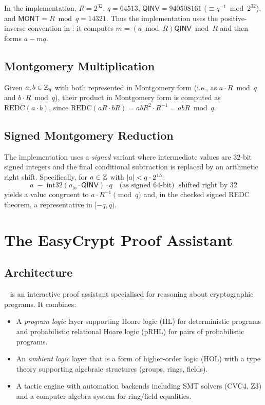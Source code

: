 In the \haetae{} implementation, $R = 2^{32}$, $q = 64513$,
$\mathsf{QINV} = 940508161$ ($\equiv q^{-1} \bmod 2^{32}$), and
$\mathsf{MONT} = R \bmod q = 14321$.  Thus the implementation uses the
positive-inverse convention in : it computes
$m = (a \bmod R)\mathsf{QINV} \bmod R$ and then forms $a - m q$.

\subsection{Montgomery Multiplication}

Given $a, b \in \mathbb{Z}_q$ with both represented in Montgomery form (i.e., as
$a \cdot R \bmod q$ and $b \cdot R \bmod q$), their product in Montgomery form
is computed as $\mathrm{REDC}(a \cdot b)$, since
$\mathrm{REDC}(aR \cdot bR) = ab R^2 \cdot R^{-1} = abR \bmod q$.

\subsection{Signed Montgomery Reduction}

The \haetae{} implementation uses a \emph{signed} variant where intermediate
values are 32-bit signed integers and the final conditional subtraction is
replaced by an arithmetic right shift.  Specifically, for $a \in \mathbb{Z}$ with
$\left|a\right| < q \cdot 2^{15}$:
\begin{equation}
  a \;-\; \text{int32}(a_{\text{lo}} \cdot \mathsf{QINV}) \cdot q
  \quad\text{(as signed 64-bit)}
  \;\text{ shifted right by 32}
\label{eq:signed_mont}
\end{equation}
yields a value congruent to $a \cdot R^{-1} \pmod{q}$ and, in the checked
signed REDC theorem, a representative in $[-q,q)$.

\section{The EasyCrypt Proof Assistant}

\subsection{Architecture}

\easycrypt{}~\cite{Barthe2011} is an interactive proof assistant specialised
for reasoning about cryptographic programs.  It combines:
\begin{itemize}
  \item A \emph{program logic} layer supporting Hoare logic (HL) for
        deterministic programs and probabilistic relational Hoare logic
        (pRHL) for pairs of probabilistic programs.

  \item An \emph{ambient logic} layer that is a form of higher-order logic
        (HOL) with a type theory supporting algebraic structures (groups,
        rings, fields).

  \item A tactic engine with automation backends including SMT solvers
        (CVC4, Z3) and a computer algebra system for ring/field equalities.
\end{itemize}

